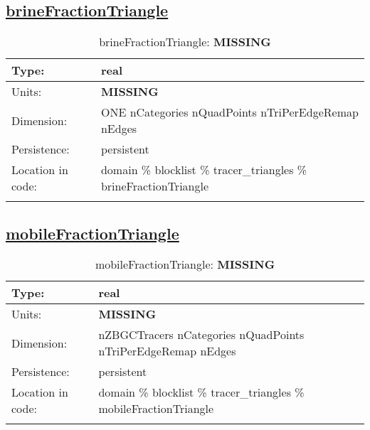 \subsection[brineFractionTriangle]{\hyperref[sec:var_tab_tracer_triangles]{brineFractionTriangle}}
\label{subsec:var_sec_tracer_triangles_brineFractionTriangle}
\begin{center}
\begin{longtable}{| p{2.0in} | p{4.0in} |}
        \hline 
        Type: & real \\
        \hline 
        Units: & {\bf \color{red} MISSING} \\
        \hline 
        Dimension: & ONE nCategories nQuadPoints nTriPerEdgeRemap nEdges \\
        \hline 
        Persistence: & persistent \\
        \hline 
         Location in code: & domain \% blocklist \% tracer\_triangles \% brineFractionTriangle \\
         \hline 
    \caption{brineFractionTriangle: {\bf \color{red} MISSING}}
\end{longtable}
\end{center}
\subsection[mobileFractionTriangle]{\hyperref[sec:var_tab_tracer_triangles]{mobileFractionTriangle}}
\label{subsec:var_sec_tracer_triangles_mobileFractionTriangle}
\begin{center}
\begin{longtable}{| p{2.0in} | p{4.0in} |}
        \hline 
        Type: & real \\
        \hline 
        Units: & {\bf \color{red} MISSING} \\
        \hline 
        Dimension: & nZBGCTracers nCategories nQuadPoints nTriPerEdgeRemap nEdges \\
        \hline 
        Persistence: & persistent \\
        \hline 
         Location in code: & domain \% blocklist \% tracer\_triangles \% mobileFractionTriangle \\
         \hline 
    \caption{mobileFractionTriangle: {\bf \color{red} MISSING}}
\end{longtable}
\end{center}

